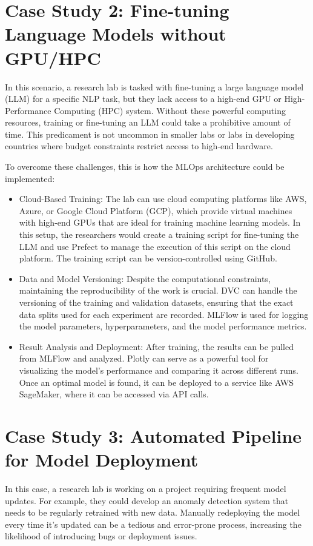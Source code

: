 \section{Case Study 2: Fine-tuning Language Models without GPU/HPC \label{study2}}
In this scenario, a research lab is tasked with fine-tuning a large language model (LLM) for a specific NLP task, but they lack access to a high-end GPU or High-Performance Computing (HPC) system. Without these powerful computing resources, training or fine-tuning an LLM could take a prohibitive amount of time. This predicament is not uncommon in smaller labs or labs in developing countries where budget constraints restrict access to high-end hardware.

To overcome these challenges, this is how the MLOps architecture could be implemented:
\begin{itemize}
    \item Cloud-Based Training: The lab can use cloud computing platforms like AWS, Azure, or Google Cloud Platform (GCP), which provide virtual machines with high-end GPUs that are ideal for training machine learning models. In this setup, the researchers would create a training script for fine-tuning the LLM and use Prefect to manage the execution of this script on the cloud platform. The training script can be version-controlled using GitHub.
    \item Data and Model Versioning: Despite the computational constraints, maintaining the reproducibility of the work is crucial. DVC can handle the versioning of the training and validation datasets, ensuring that the exact data splits used for each experiment are recorded. MLFlow is used for logging the model parameters, hyperparameters, and the model performance metrics.
    \item Result Analysis and Deployment: After training, the results can be pulled from MLFlow and analyzed. Plotly can serve as a powerful tool for visualizing the model's performance and comparing it across different runs. Once an optimal model is found, it can be deployed to a service like AWS SageMaker, where it can be accessed via API calls.
\end{itemize}

\section{Case Study 3: Automated Pipeline for Model Deployment \label{study3}}
In this case, a research lab is working on a project requiring frequent model updates. For example, they could develop an anomaly detection system that needs to be regularly retrained with new data. Manually redeploying the model every time it's updated can be a tedious and error-prone process, increasing the likelihood of introducing bugs or deployment issues.

